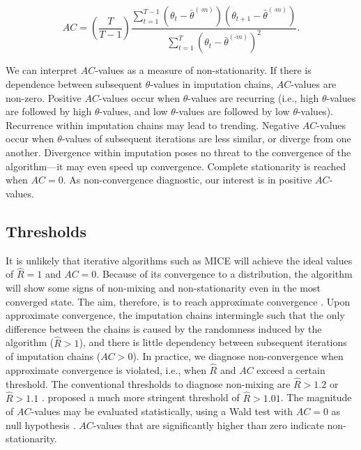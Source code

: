 \documentclass[Royal,times,sageh]{sagej}
\begin{document}
\begin{equation*}
AC = \left( \frac{T}{T-1} \right) \frac{\sum_{t=1}^{T-1}(\theta_t - \bar{\theta}^{(\cdot m)})(\theta_{t+1} - \bar{\theta}^{(\cdot m)})}{\sum_{t=1}^{T}(\theta_t - \bar{\theta}^{(\cdot m)})^2}.
\end{equation*}

We can interpret \(AC\)-values as a measure of non-stationarity. If there is dependence between subsequent \(\theta\)-values in imputation chains, \(AC\)-values are non-zero. Positive \(AC\)-values occur when \(\theta\)-values are recurring (i.e., high \(\theta\)-values are followed by high \(\theta\)-values, and low \(\theta\)-values are followed by low \(\theta\)-values). Recurrence within imputation chains may lead to trending. Negative \(AC\)-values occur when \(\theta\)-values of subsequent iterations are less similar, or diverge from one another. Divergence within imputation poses no threat to the convergence of the algorithm---it may even speed up convergence. Complete stationarity is reached when \(AC=0\). As non-convergence diagnostic, our interest is in positive \(AC\)-values.

\hypertarget{thresholds}{%
\subsection{Thresholds}\label{thresholds}}

It is unlikely that iterative algorithms such as MICE will achieve the ideal values of \(\widehat{R}=1\) and \(AC=0\). Because of its convergence to a distribution, the algorithm will show some signs of non-mixing and non-stationarity even in the most converged state. The aim, therefore, is to reach approximate convergence \citep{gelm13}. Upon approximate convergence, the imputation chains intermingle such that the only difference between the chains is caused by the randomness induced by the algorithm (\(\widehat{R} > 1\)), and there is little dependency between subsequent iterations of imputation chains (\(AC > 0\)). In practice, we diagnose non-convergence when approximate convergence is violated, i.e., when \(\widehat{R}\) and \(AC\) exceed a certain threshold. The conventional thresholds to diagnose non-mixing are \(\widehat{R} > 1.2\) \citep{gelm92} or \(\widehat{R} > 1.1\) \citep{gelm13}. \citet{veht19} proposed a much more stringent threshold of \(\widehat{R} > 1.01\). The magnitude of \(AC\)-values may be evaluated statistically, using a Wald test with \(AC=0\) as null hypothesis \citep{box15}. \(AC\)-values that are significantly higher than zero indicate non-stationarity.
\end{document}

